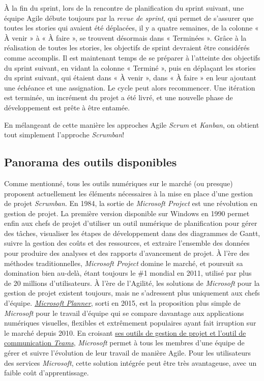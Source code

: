 \documentclass[
  letterpaper,
  DIV=11,
  numbers=noendperiod,
  oneside]{scrreprt}
\begin{document}
À la fin du sprint, lors de la rencontre de planification du sprint
suivant, une équipe Agile débute toujours par la \emph{revue de sprint},
qui permet de s'assurer que toutes les stories qui avaient été
déplacées, il y a quatre semaines, de la colonne « À venir » à « À faire
», se trouvent désormais dans « Terminées ». Grâce à la réalisation de
toutes les stories, les objectifs de sprint devraient être considérés
comme accomplis. Il est maintenant temps de se préparer à l'atteinte des
objectifs du sprint suivant, en vidant la colonne « Terminé », puis en
déplaçant les stories du sprint suivant, qui étaient dans « À venir »,
dans « À faire » en leur ajoutant une échéance et une assignation. Le
cycle peut alors recommencer. Une itération est terminée, un incrément
du projet a été livré, et une nouvelle phase de développement est prête
à être entamée.

En mélangeant de cette manière les approches Agile \emph{Scrum} et
\emph{Kanban}, on obtient tout simplement l'approche \emph{Scrumban}!

\hypertarget{panorama-des-outils-disponibles}{%
\subsection{Panorama des outils
disponibles}\label{panorama-des-outils-disponibles}}

Comme mentionné, tous les outils numériques sur le marché (ou presque)
proposent actuellement les éléments nécessaires à la mise en place d'une
gestion de projet \emph{Scrumban}. En 1984, la sortie de \emph{Microsoft
Project} est une révolution en gestion de projet. La première version
disponible sur Windows en 1990 permet enfin aux chefs de projet
d'utiliser un outil numérique de planification pour gérer des tâches,
visualiser les étapes de développement dans des diagrammes de Gantt,
suivre la gestion des coûts et des ressources, et extraire l'ensemble
des données pour produire des analyses et des rapports d'avancement de
projet. À l'ère des méthodes traditionnelles, \emph{Microsoft Project}
domine le marché, et poursuit sa domination bien au-delà, étant toujours
le \#1 mondial en 2011, utilisé par plus de 20 millions d'utilisateurs.
À l'ère de l'Agilité, les solutions de \emph{Microsoft} pour la gestion
de projet existent toujours, mais ne s'adressent plus uniquement aux
chefs d'équipe. \href{https://tasks.office.com/}{\emph{Microsoft
Planner}}, sorti en 2015, est la proposition plus simple de
\emph{Microsoft} pour le travail d'équipe qui se compare davantage aux
applications numériques visuelles, flexibles et extrêmement populaires
ayant fait irruption sur le marché depuis 2010. En croisant
\href{https://www.microsoft.com/fr-ca/microsoft-365/project/agile-methodology}{ses
outils de gestion de projet et l'outil de communication \emph{Teams}},
\emph{Microsoft} permet à tous les membres d'une équipe de gérer et
suivre l'évolution de leur travail de manière Agile. Pour les
utilisateurs des services \emph{Microsoft}, cette solution intégrée peut
être très avantageuse, avec un faible coût d'apprentissage.
\end{document}
